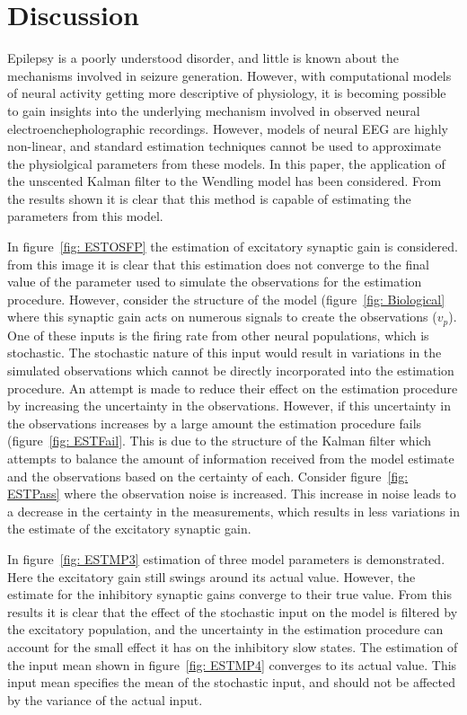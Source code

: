 \section{Discussion}

Epilepsy is a poorly understood disorder, and little is known about the mechanisms involved in seizure generation. However, with computational models of neural activity getting more descriptive of physiology, it is becoming possible to gain insights into the underlying mechanism involved in observed neural electroenchepholographic recordings. However, models of neural EEG are highly non-linear, and standard estimation techniques cannot be used to approximate the physiolgical parameters from these models. In this paper, the application of the unscented Kalman filter to the Wendling model has been considered. From the results shown it is clear that this method is capable of estimating the parameters from this model.

In  figure~\ref{fig: ESTOSFP} the estimation of excitatory synaptic gain is considered. from this image it is clear that this estimation does not converge to the final value of the parameter used to simulate the observations for the estimation procedure. However, consider the structure of the model (figure~\ref{fig: Biological} where this synaptic gain acts on numerous signals to create the observations ($v_{p}$). One of these inputs is the firing rate from other neural populations, which is stochastic. The stochastic nature of this input would result in variations in the simulated observations which cannot be directly incorporated into the estimation procedure. An attempt is made to reduce their effect on the estimation procedure by increasing the uncertainty in the observations. However, if this uncertainty in the observations increases by a large amount the estimation procedure fails (figure~\ref{fig: ESTFail}. This is due to the structure of the Kalman filter which attempts to balance the amount of information received from the model estimate and the observations based on the certainty of each. Consider figure~\ref{fig: ESTPass} where the observation noise is increased. This increase in noise leads to a decrease in the certainty in the measurements, which results in less variations in the estimate of the excitatory synaptic gain.  

In figure~\ref{fig: ESTMP3}  estimation of three model parameters is demonstrated. Here the excitatory gain still swings around its actual value. However, the estimate for the inhibitory synaptic gains converge to their true value. From this results it is clear that the effect of the stochastic input on the model is filtered by the excitatory population, and the uncertainty in the estimation procedure can account for the small effect it has on the inhibitory slow states. The estimation of the input mean shown in figure~\ref{fig: ESTMP4} converges to its actual value. This input mean specifies the mean of the stochastic input, and should not be affected by the variance of the actual input.

